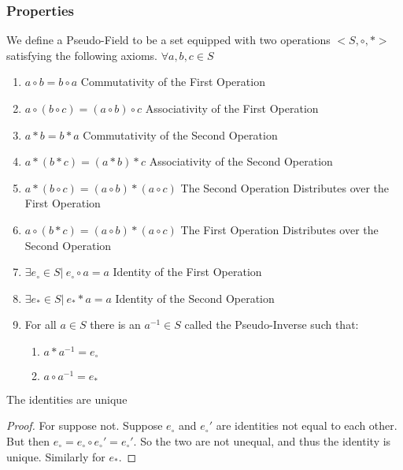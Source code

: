 \documentclass[crop=false,class=book,oneside]{standalone}
\begin{document}
            \subsubsection{Properties}
            We define a Pseudo-Field to be a set equipped with two operations $<S,\circ, *>$ satisfying the following axioms.
            $\forall a,b,c \in S$
            \begin{enumerate}
                \item $a\circ b = b\circ a$ \hfill Commutativity of the First Operation
                \item $a\circ (b\circ c)=(a \circ b)\circ c$ \hfill Associativity of the First Operation
                \item $a*b = b*a$ \hfill Commutativity of the Second Operation
                \item $a*(b*c) = (a*b)*c$ \hfill Associativity of the Second Operation
                \item $a*(b\circ c)=(a\circ b)*(a\circ c)$ \hfill The Second Operation Distributes over the First Operation
                \item $a\circ (b*c) = (a\circ b)*(a\circ c)$ \hfill The First Operation Distributes over the Second Operation
                \item $\exists e_{\circ}\in S|\ e_{\circ}\circ a = a$ \hfill Identity of the First Operation
                \item $\exists e_{*} \in S|\ e_{*}*a = a$ \hfill Identity of the Second Operation
                \item For all $a\in S$ there is an $a^{-1}\in S$ called the Pseudo-Inverse such that:
                \begin{enumerate}
                    \item $a*a^{-1} = e_{\circ}$
                    \item $a\circ a^{-1}=e_{*}$
                \end{enumerate}
            \end{enumerate}
            \begin{theorem} The identities are unique
            \end{theorem}
            \begin{proof} For suppose not. Suppose $e_{\circ}$ and $e_{\circ}'$ are identities not equal to each other. But then $e_{\circ}=e_{\circ}\circ e_{\circ}'=e_{\circ}'$. So the two are not unequal, and thus the identity is unique. Similarly for $e_{*}$.
            \end{proof}
\end{document}
